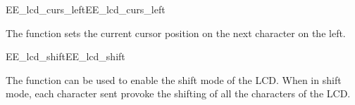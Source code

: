 \begin{function_nopb2}{EE\_lcd\_curs\_left}{EE_lcd_curs_left}
  
  \begin{fundescription}
    The function sets the current cursor position on the next
    character on the left.
  \end{fundescription}
  
  
  
\end{function_nopb2}


\begin{function_nopb2}{EE\_lcd\_shift}{EE_lcd_shift}
  
  \begin{fundescription}
    The function can be used to enable the shift mode of the LCD. When
    in shift mode, each character sent provoke the shifting of all the
    characters of the LCD.
  \end{fundescription}
  
  
  
\end{function_nopb2}

